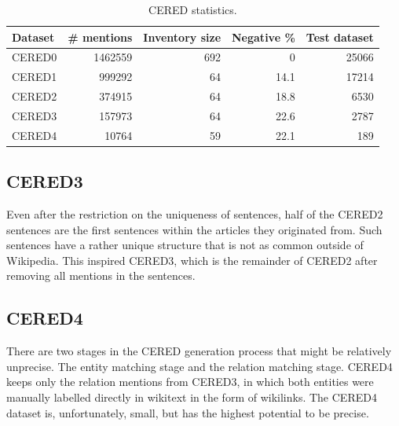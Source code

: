 \begin{table}

\caption{CERED statistics.}

\label{table:CEREDsStatistics}

\begin{tabular}{p{} r r r r }

\hline
Dataset & \# mentions & Inventory size & Negative \% & Test dataset\\
\hline
\hline
CERED0 & \num{1462559} & 692 & 0 & \num{25066}\\
CERED1 & \num{999292} & 64 & 14.1 & \num{17214}\\
CERED2 & \num{374915} & 64 & 18.8 & \num{6530}\\
CERED3 & \num{157973} & 64 & 22.6 & \num{2787}\\
CERED4 & \num{10764} & 59 & 22.1 & 189\\
\hline


\end{tabular}

\end{table}






\subsection{CERED3}
Even after the restriction on the uniqueness of sentences, half of the CERED2 sentences are the first sentences within the articles they originated from. Such sentences have a rather unique structure that is not as common outside of Wikipedia. This inspired CERED3, which is the remainder of CERED2 after removing all mentions in the  sentences.

\subsection{CERED4}
There are two stages in the CERED generation process that might be relatively unprecise. The entity matching stage and the relation matching stage. CERED4 keeps only the relation mentions from CERED3, in which both entities were manually labelled directly in wikitext in the form of wikilinks. The CERED4 dataset is, unfortunately, small, but has the highest potential to be precise.


